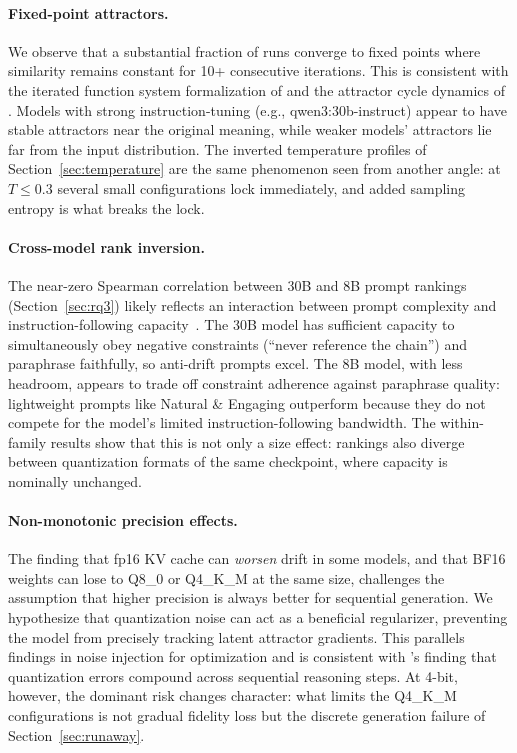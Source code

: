 \documentclass[11pt]{article}
\begin{document}
\paragraph{Fixed-point attractors.}
We observe that a substantial fraction of runs converge to fixed points where
similarity remains constant for 10+ consecutive iterations. This is consistent
with the iterated function system formalization of \citet{chytas2025concept}
and the attractor cycle dynamics of \citet{wang2025attractor}. Models with
strong instruction-tuning (e.g., qwen3:30b-instruct) appear to have stable
attractors near the original meaning, while weaker models' attractors lie
far from the input distribution. The inverted temperature profiles of
Section~\ref{sec:temperature} are the same phenomenon seen from another angle:
at $T\leq0.3$ several small configurations lock immediately, and added sampling
entropy is what breaks the lock.

\paragraph{Cross-model rank inversion.}
The near-zero Spearman correlation between 30B and 8B prompt rankings
(Section~\ref{sec:rq3}) likely reflects an interaction between prompt complexity
and instruction-following capacity~\citep{jaroslawicz2025ifscale}. The 30B model
has sufficient capacity to simultaneously obey negative constraints (``never
reference the chain'') and paraphrase faithfully, so anti-drift prompts excel.
The 8B model, with less headroom, appears to trade off constraint adherence
against paraphrase quality: lightweight prompts like Natural \& Engaging
outperform because they do not compete for the model's limited
instruction-following bandwidth. The within-family results show that this is not
only a size effect: rankings also diverge between quantization formats of the
same checkpoint, where capacity is nominally unchanged.

\paragraph{Non-monotonic precision effects.}
The finding that fp16 KV cache can \emph{worsen} drift in some models, and that
BF16 weights can lose to Q8\_0 or Q4\_K\_M at the same size, challenges the
assumption that higher precision is always better for sequential
generation. We hypothesize that quantization noise can act as a
beneficial regularizer, preventing the model from precisely tracking latent
attractor gradients. This parallels findings in noise injection for optimization
and is consistent with \citet{han2026quantization}'s finding that quantization
errors compound across sequential reasoning steps. At 4-bit, however, the
dominant risk changes character: what limits the Q4\_K\_M configurations is not
gradual fidelity loss but the discrete generation failure of
Section~\ref{sec:runaway}.
\end{document}
